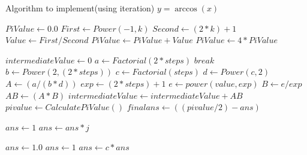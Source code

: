 \documentclass[a4paper,10pt]{report}
\begin{document}
\begin{algorithm}
\caption{Algorithm to implement(using iteration) $y=\arccos(x)$}
\label{alg:myalgo}
\begin{algorithmic}[1]

 \label{alg:a-line}
    \State $PiValue \gets 0.0$
    	\State $First \gets Power(-1,k)$
	    \State $Second \gets (2*k)+1$
	    \State $Value \gets  First/Second$ 
	    \State $PiValue \gets  PiValue + Value$ 
	\EndFor	
	    \State $PiValue \gets  4*PiValue$ 
        \State {}
\EndFunction

\Statex
{} \label{alg:a-line}
		\State {}
	\EndIf
	    \State {}
	\EndIf

    \State $intermediateValue \gets 0$
        \State $a \gets Factorial(2 * steps)$
    		\State $break$
	    \EndIf
		\State $b \gets Power(2, (2 * steps))$
		\State $c \gets Factorial(steps)$ 
		\State $d \gets Power(c, 2)$
		\State $A \gets (a / (b * d))$
		\State $exp \gets (2 * steps) + 1$
		\State $e  \gets power(value, exp)$
		\State $B  \gets e / exp$
		\State $AB \gets  (A * B)$
		\State $intermediateValue \gets intermediateValue + AB$
	\EndFor
		\State $pivalue  \gets CalculatePiValue()$
		\State $finalans \gets ((pivalue / 2) - ans)$
        \State {}
\EndFunction

\Statex
{} \label{alg:a-line}
		\State $ans \gets 1$
		\State {}
	\EndIf
		\State $ans \gets ans*j$
	\EndFor
	\State {}
\EndFunction

\Statex
{} \label{alg:a-line}
		\State $ans \gets 1.0$
			\State $ans \gets 1$
			\State {}
		\EndIf
			\State $ans \gets c*ans$
		\EndFor
		\State {}
\EndFunction
\Statex
\end{algorithmic}
\end{algorithm}
\end{document}
